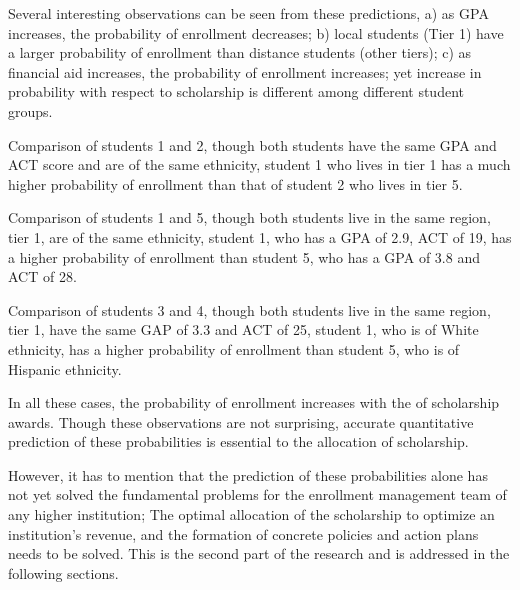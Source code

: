 \documentclass[12pt,english]{report}
\begin{document}
Several interesting observations can be seen from these predictions, a) as GPA 
increases, the probability of enrollment decreases; b) local students (Tier 1) 
have a larger probability of enrollment than distance students (other tiers); 
c) as financial aid increases, the probability of enrollment increases; yet 
increase in probability with respect to scholarship is different among 
different student groups.

Comparison of students 1 and 2, though both students have the same GPA and ACT 
score and are of the same ethnicity, student 1 who lives in tier 1 has a much 
higher probability of enrollment than that of student 2 who lives in tier 5.

Comparison of students 1 and 5, though both students live in the same region, 
tier 1, are of the same ethnicity, student 1, who has a GPA of 2.9, ACT of 19, 
has a higher probability of enrollment than student 5, who has a GPA of 3.8 
and ACT of 28.

Comparison of students 3 and 4, though both students live in the same region, 
tier 1, have the same GAP of 3.3 and ACT of 25, student 1, who is of White 
ethnicity, has a higher probability of enrollment than student 5, who is of 
Hispanic ethnicity.

In all these cases, the probability of enrollment increases with the of 
scholarship awards. Though these observations are not surprising, accurate 
quantitative prediction of these probabilities is essential to the allocation 
of scholarship.

However, it has to mention that the prediction of these probabilities alone 
has not yet solved the fundamental problems for the enrollment management team 
of any higher institution;  The optimal allocation of the scholarship to 
optimize an institution's revenue, and the formation of concrete policies and 
action plans needs to be solved. This is the second part of the research and 
is addressed in the following sections.

\end{document}
